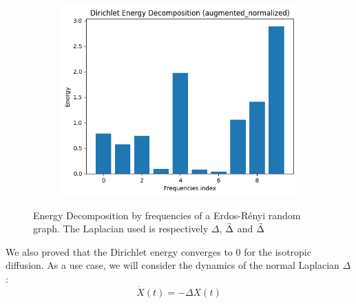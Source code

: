 \documentclass[12pt]{article}
\begin{document}
\begin{figure}[h!]
\begin{subfigure}{.33\textwidth}
  \includegraphics[width=1\linewidth]{images/energy3.png}
\end{subfigure}%
\caption{Energy Decomposition by frequencies of a Erdos-Rényi random graph. The Laplacian used is respectively $\Delta$, $\Bar{\Delta}$ and $\Tilde{\Delta}$}
\end{figure}

We also proved that the Dirichlet energy converges to 0 for the isotropic diffusion. As a use case, we will consider the dynamics of the normal Laplacian $\Delta$:
$$
\dot{X}(t) = -\Delta X(t)
$$
\end{document}
